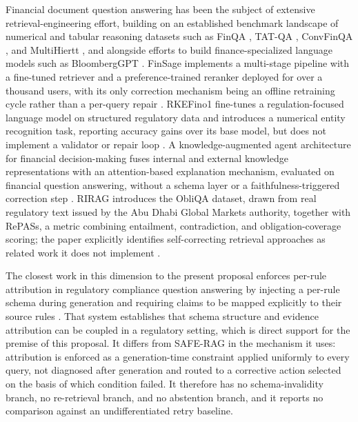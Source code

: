 \documentclass[10pt,twocolumn,letterpaper]{article}
\begin{document}
Financial document question answering has been the subject of extensive retrieval-engineering effort, building on an established benchmark landscape of numerical and tabular reasoning datasets such as FinQA \cite{finqa}, TAT-QA \cite{tatqa}, ConvFinQA \cite{convfinqa}, and MultiHiertt \cite{multihiertt}, and alongside efforts to build finance-specialized language models such as BloombergGPT \cite{bloomberggpt}. FinSage implements a multi-stage pipeline with a fine-tuned retriever and a preference-trained reranker deployed for over a thousand users, with its only correction mechanism being an offline retraining cycle rather than a per-query repair \cite{finsage}. RKEFino1 fine-tunes a regulation-focused language model on structured regulatory data and introduces a numerical entity recognition task, reporting accuracy gains over its base model, but does not implement a validator or repair loop \cite{rkefino1}. A knowledge-augmented agent architecture for financial decision-making fuses internal and external knowledge representations with an attention-based explanation mechanism, evaluated on financial question answering, without a schema layer or a faithfulness-triggered correction step \cite{knowagent}. RIRAG introduces the ObliQA dataset, drawn from real regulatory text issued by the Abu Dhabi Global Markets authority, together with RePASs, a metric combining entailment, contradiction, and obligation-coverage scoring; the paper explicitly identifies self-correcting retrieval approaches as related work it does not implement \cite{rirag}.

The closest work in this dimension to the present proposal enforces per-rule attribution in regulatory compliance question answering by injecting a per-rule schema during generation and requiring claims to be mapped explicitly to their source rules \cite{refwalk}. That system establishes that schema structure and evidence attribution can be coupled in a regulatory setting, which is direct support for the premise of this proposal. It differs from SAFE-RAG in the mechanism it uses: attribution is enforced as a generation-time constraint applied uniformly to every query, not diagnosed after generation and routed to a corrective action selected on the basis of which condition failed. It therefore has no schema-invalidity branch, no re-retrieval branch, and no abstention branch, and it reports no comparison against an undifferentiated retry baseline.
\end{document}
